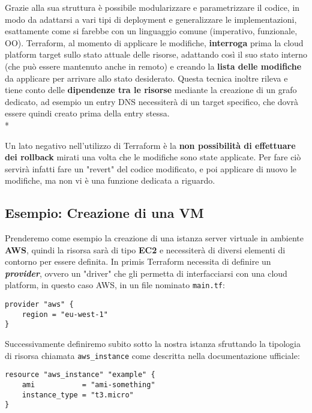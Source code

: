\documentclass[../main.tex]{subfiles}
\begin{document}
    	    Grazie alla sua struttura è possibile modularizzare e parametrizzare il codice, in modo da adattarsi a vari tipi di deployment e generalizzare le implementazioni, esattamente come si farebbe con un linguaggio comune (imperativo, funzionale, OO). Terraform, al momento di applicare le modifiche, \textbf{interroga} prima la cloud platform target sullo stato attuale delle risorse, adattando così il suo stato interno (che può essere mantenuto anche in remoto) e creando la \textbf{lista delle modifiche} da applicare per arrivare allo stato desiderato. Questa tecnica inoltre rileva e tiene conto delle \textbf{dipendenze tra le risorse} mediante la creazione di un grafo dedicato, ad esempio un entry DNS necessiterà di un target specifico, che dovrà essere quindi creato prima della entry stessa.\\*
    	    
    	    Un lato negativo nell'utilizzo di Terraform è la \textbf{non possibilità di effettuare dei rollback} mirati una volta che le modifiche sono state applicate. Per fare ciò servirà infatti fare un "revert" del codice modificato, e poi applicare di nuovo le modifiche, ma non vi è una funzione dedicata a riguardo.
    	    
    	    \subsection{Esempio: Creazione di una VM}
    	    
    	        Prenderemo come esempio la creazione di una istanza server virtuale in ambiente \textbf{AWS}, quindi la risorsa sarà di tipo \textbf{EC2} e necessiterà di diversi elementi di contorno per essere definita. In primis Terraform necessita di definire un \textbf{\emph{provider}}, ovvero un "driver" che gli permetta di interfacciarsi con una cloud platform, in questo caso AWS, in un file nominato \verb|main.tf|:
    	        \begin{lstlisting}
provider "aws" {
    region = "eu-west-1"
}
    	        \end{lstlisting}
    	        
    	        Successivamente definiremo subito sotto la nostra istanza sfruttando la tipologia di risorsa chiamata \verb|aws_instance| come descritta nella documentazione ufficiale:
    	            	        \begin{lstlisting}
resource "aws_instance" "example" {
    ami           = "ami-something"
    instance_type = "t3.micro"
}
    	        \end{lstlisting}
    	        
\end{document}
